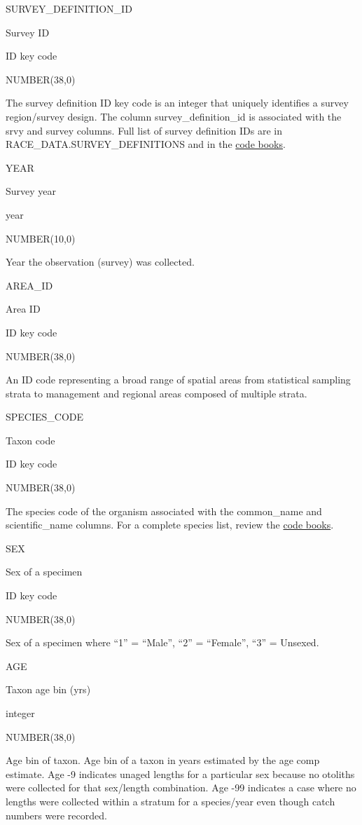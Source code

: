 \documentclass[
  letterpaper,
  oneside,
  open=any]{scrbook}
\begin{document}
SURVEY\_DEFINITION\_ID

Survey ID

ID key code

NUMBER(38,0)

The survey definition ID key code is an integer that uniquely identifies
a survey region/survey design. The column survey\_definition\_id is
associated with the srvy and survey columns. Full list of survey
definition IDs are in RACE\_DATA.SURVEY\_DEFINITIONS and in the
\href{https://www.fisheries.noaa.gov/resource/document/groundfish-survey-species-code-manual-and-data-codes-manual}{code
books}.

YEAR

Survey year

year

NUMBER(10,0)

Year the observation (survey) was collected.

AREA\_ID

Area ID

ID key code

NUMBER(38,0)

An ID code representing a broad range of spatial areas from statistical
sampling strata to management and regional areas composed of multiple
strata.

SPECIES\_CODE

Taxon code

ID key code

NUMBER(38,0)

The species code of the organism associated with the common\_name and
scientific\_name columns. For a complete species list, review the
\href{https://www.fisheries.noaa.gov/resource/document/groundfish-survey-species-code-manual-and-data-codes-manual}{code
books}.

SEX

Sex of a specimen

ID key code

NUMBER(38,0)

Sex of a specimen where ``1'' = ``Male'', ``2'' = ``Female'', ``3'' =
Unsexed.

AGE

Taxon age bin (yrs)

integer

NUMBER(38,0)

Age bin of taxon. Age bin of a taxon in years estimated by the age comp
estimate. Age -9 indicates unaged lengths for a particular sex because
no otoliths were collected for that sex/length combination. Age -99
indicates a case where no lengths were collected within a stratum for a
species/year even though catch numbers were recorded.
\end{document}
